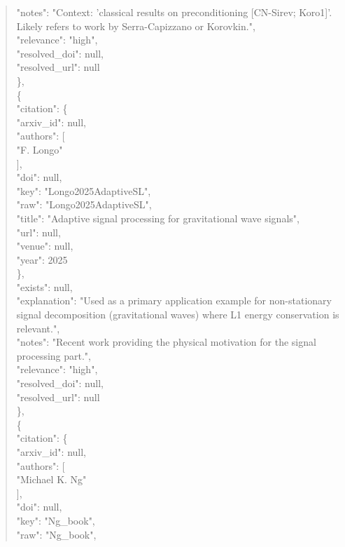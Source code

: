 \documentclass[11pt]{article}
\begin{document}
\begin{quote}
      "notes": "Context: 'classical results on preconditioning [CN-Sirev; Koro1]'. Likely refers to work by Serra-Capizzano or Korovkin.",\\
      "relevance": "high",\\
      "resolved\_doi": null,\\
      "resolved\_url": null\\
    \},\\
    \{\\
      "citation": \{\\
        "arxiv\_id": null,\\
        "authors": [\\
          "F. Longo"\\
        ],\\
        "doi": null,\\
        "key": "Longo2025AdaptiveSL",\\
        "raw": "Longo2025AdaptiveSL",\\
        "title": "Adaptive signal processing for gravitational wave signals",\\
        "url": null,\\
        "venue": null,\\
        "year": 2025\\
      \},\\
      "exists": null,\\
      "explanation": "Used as a primary application example for non-stationary signal decomposition (gravitational waves) where L1 energy conservation is relevant.",\\
      "notes": "Recent work providing the physical motivation for the signal processing part.",\\
      "relevance": "high",\\
      "resolved\_doi": null,\\
      "resolved\_url": null\\
    \},\\
    \{\\
      "citation": \{\\
        "arxiv\_id": null,\\
        "authors": [\\
          "Michael K. Ng"\\
        ],\\
        "doi": null,\\
        "key": "Ng\_book",\\
        "raw": "Ng\_book",\\

\end{quote}
\end{document}

